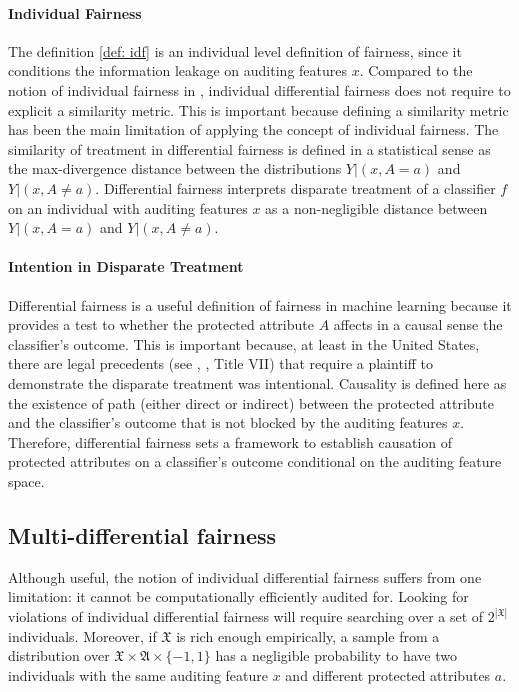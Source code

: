 \documentclass{article}
\begin{document}
\paragraph{Individual Fairness}
The definition \ref{def: idf} is an individual level definition of fairness, since it conditions the information leakage on auditing features $x$. Compared to the notion of individual fairness in \cite{dwork2012fairness}, individual differential fairness does not require to explicit a similarity metric. This is important because defining a similarity metric has been the main limitation of applying the concept of individual fairness. The similarity of treatment in differential fairness is defined in a statistical sense as the max-divergence distance between the distributions $Y|(x, A=a)$ and $Y|(x, A\neq a)$. Differential fairness interprets disparate treatment of a classifier $f$ on an individual with auditing features $x$ as a non-negligible distance between $Y|(x, A=a)$ and $Y|(x, A\neq a)$. 

\paragraph{Intention in Disparate Treatment}
Differential fairness is a useful definition of fairness in machine learning because it provides a test to whether the protected attribute $A$ affects in a causal sense the classifier's outcome. This is important because, at least in the United States, there are legal precedents (see \cite{Ricci}, \cite{Loomis}, Title VII) that require a plaintiff to demonstrate the disparate treatment was intentional. Causality is defined here as the existence of path (either direct or indirect) between the protected attribute and the classifier's outcome that is not blocked by the auditing features $x$. Therefore, differential fairness sets a framework to establish causation of protected attributes on a classifier's outcome conditional on the auditing feature space. 

\subsection{Multi-differential fairness}
Although useful, the notion of individual differential fairness suffers from one limitation: it cannot be computationally efficiently audited for. Looking for violations of individual differential fairness will require searching over a set of $2^{|\mathfrak{X}|}$ individuals. Moreover, if $\mathfrak{X}$ is rich enough empirically, a sample from a distribution over $\mathfrak{X} \times \mathfrak{A}\times \{-1, 1\}$ has a negligible probability to have two individuals with the same auditing feature $x$ and different protected attributes $a$. 
\end{document}
